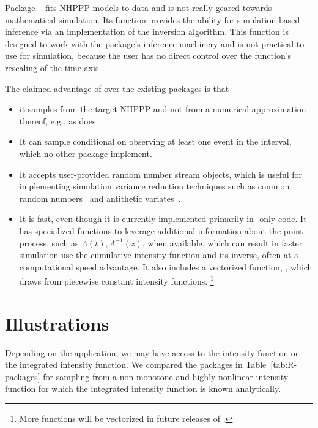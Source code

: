 \documentclass[article,nojss]{jss}\usepackage[]{graphicx}\usepackage[]{xcolor}
\newcommand{\fct}[1]{\code{#1()}}
\begin{document}
Package ~\citep{NHPoisson-jss, NHPoisson-package} fits NHPPP models to data and is not really geared towards mathematical simulation. Its \fct{simNHP.fun} function provides the ability for simulation-based inference via an implementation of the inversion algorithm. This function is designed to work with the package's inference machinery and is not practical to use for simulation, because the user has no direct control over the function's rescaling of the time axis.

The claimed advantage of  over the existing packages is that
\begin{itemize}
\item it samples from the target NHPPP and not from a numerical approximation thereof, e.g., as  does.
\item It can  sample conditional on observing at least one event in the interval, which no other package implement.
\item It accepts user-provided random number stream objects, which is useful for implementing simulation variance reduction techniques such as common random numbers~\citep{wright1979crn} and antithetic variates~\citep{hammersley1956av}.
\item It is fast, even though it is currently implemented primarily in -only code. It has specialized functions to leverage additional information about the point process, such as $\Lambda(t), \Lambda^{-1}(z)$, when available, which can result in faster simulation  use the cumulative intensity function and its inverse, often at a computational speed advantage. It also includes a vectorized function, \fct{vdraw\_sc\_step\_regular}, which draws from piecewise constant intensity functions.%
\footnote{More functions will be vectorized in future releases of .}
\end{itemize}



\section{Illustrations} \label{sec:illustrations}

Depending on the application, we may have access to the intensity function
or the integrated intensity function.
We compared the  packages in Table~\ref{tab:R-packages} for sampling from a non-monotone and highly nonlinear intensity function for which the integrated intensity function is known analytically.
\end{document}
